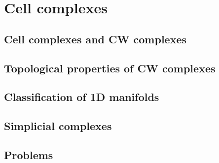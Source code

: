 \chapter{Cell complexes}
\section{Cell complexes and CW complexes}
\section{Topological properties of CW complexes}
\section{Classification of 1D manifolds}
\section{Simplicial complexes}
\section{Problems}
